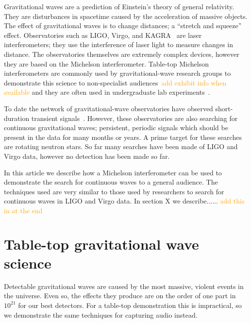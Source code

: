 \documentclass[prb,preprint]{revtex4-1}
\newcommand{\han}{\textcolor{orange}}
\begin{document}
Gravitational waves are a prediction of Einstein's theory of general relativity. 
They are disturbances in spacetime caused by the acceleration of massive objects. 
The effect of gravitational waves is to change distances; a ``stretch and squeeze'' effect. 
Observatories such as LIGO, Virgo, and KAGRA~\cite{KAGRA:2013} are laser interferometers; they use the interference of laser light to measure changes in distance. 
The observatories themselves are extremely complex devices, however they are based on the Michelson interferometer. 
Table-top Michelson interferometers are commonly used by gravitational-wave research groups to demonstrate this science to non-specialist audiences~\cite{ThorLabsIFO,NikhefIFO}\han{add exhibit info when available} and they are often used in undergraduate lab experiments~\cite{UgoliniEtAl:2019}. 


To date the network of gravitational-wave observatories have observed short-duration transient signals~\cite{GWTC-1:2018,GWOSC:online}. 
However, these observatories are also searching for continuous gravitational waves; persistent, periodic signals which should be present in the data for many months or years. 
A prime target for these searches are rotating neutron stars. 
So far many searches have been made of LIGO and Virgo data, however no detection has been made so far.


In this article we describe how a Michelson interferometer can be used to demonstrate the search for continuous waves to a general audience. 
The techniques used are very similar to those used by researchers to search for continuous waves in LIGO and Virgo data. 
In section X we describe...... \han{add this in at the end}


\section{Table-top gravitational wave science}

Detectable gravitational waves are caused by the most massive, violent events in the universe. Even so, the effects they produce are on the order of one part in $10^{21}$ for our best detectors. For a table-top demonstration this is impractical, so we demonstrate the same techniques for capturing audio instead.
\end{document}
